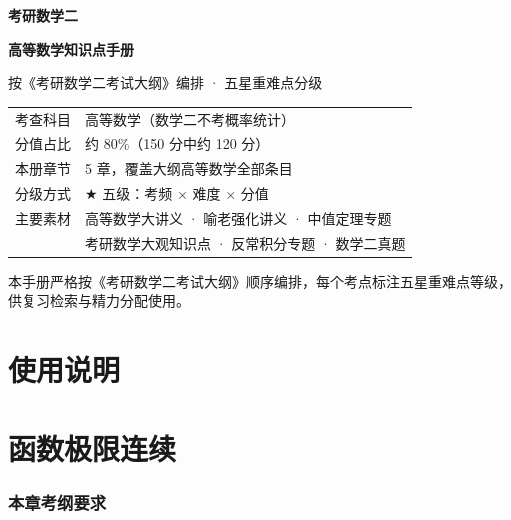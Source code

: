 \documentclass[11pt,openany,UTF8]{ctexbook}
\begin{document}
\begin{titlepage}
\centering
\vspace*{2.6cm}
{\Huge\bfseries 考研数学二\par}
\vspace{0.5cm}
{\Huge\bfseries 高等数学知识点手册\par}
\vspace{0.9cm}
{\Large 按《考研数学二考试大纲》编排 · 五星重难点分级\par}
\vspace{1.8cm}
{\normalsize
\begin{tabular}{rl}
考查科目 & 高等数学（数学二不考概率统计） \\
分值占比 & 约 80\%（150 分中约 120 分） \\
本册章节 & 5 章，覆盖大纲高等数学全部条目 \\
分级方式 & $\bigstar$ 五级：考频 $\times$ 难度 $\times$ 分值 \\
主要素材 & 高等数学大讲义 · 喻老强化讲义 · 中值定理专题 \\
 & 考研数学大观知识点 · 反常积分专题 · 数学二真题
\end{tabular}\par}
\vfill
{\small 本手册严格按《考研数学二考试大纲》顺序编排，每个考点标注五星重难点等级，供复习检索与精力分配使用。\par}
\vspace{1.0cm}
\end{titlepage}


\frontmatter
\pagestyle{fancy}
\chapter*{使用说明}

\cleardoublepage
\tableofcontents
\mainmatter

\chapter{函数极限连续}
\subsection*{本章考纲要求}
\end{document}
